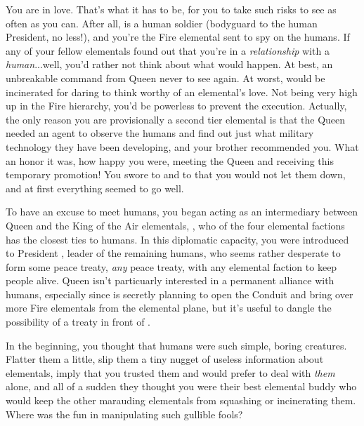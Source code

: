 \documentclass[char]{elementals}
\begin{document}
\name{\cJuliet{}}

You are in love.  That's what it has to be, for you to take such risks to see \cRomeo{\intro} as often as you can.  After all, \cRomeo{\they} is a human soldier (bodyguard to the human President, no less!), and you're the Fire elemental sent to spy on the humans.  If any of your fellow elementals found out that you're in a \emph{relationship} with a \emph{human}...well, you'd rather not think about what would happen.  At best, an unbreakable command from Queen \cQueen{\intro} never to see \cRomeo{} again.  At worst, \cRomeo{\they} would be incinerated for daring to think \cRomeo{\themself} worthy of an elemental's love.  Not being very high up in the Fire hierarchy, you'd be powerless to prevent the execution.  Actually, the only reason you are provisionally a second tier elemental is that the Queen needed an agent to observe the humans and find out just what military technology they have been developing, and your brother \cPyro{\intro} recommended you.  What an honor it was, how happy you were, meeting the Queen and receiving this temporary promotion!  You swore to \cQueen{\them} and to \cPyro{} that you would not let them down, and at first everything seemed to go well.

To have an excuse to meet humans, you began acting as an intermediary between Queen \cQueen{} and the King of the Air elementals, \cKing{\intro}, who of the four elemental factions has the closest ties to humans.  In this diplomatic capacity, you were introduced to President \cLeader{\intro}, leader of the remaining humans, who seems rather desperate to form some peace treaty, \emph{any} peace treaty, with any elemental faction to keep \cLeader{\their} people alive.  Queen \cQueen{} isn't particuarly interested in a permanent alliance with humans, especially since \cQueen{\they} is secretly planning to open the Conduit and bring over more Fire elementals from the elemental plane, but it's useful to dangle the possibility of a treaty in front of \cLeader{\them}.  

In the beginning, you thought that humans were such simple, boring creatures.  Flatter them a little, slip them a tiny nugget of useless information about elementals, imply that you trusted them and would prefer to deal with \emph{them} alone, and all of a sudden they thought you were their best elemental buddy who would keep the other marauding elementals from squashing or incinerating them.  Where was the fun in manipulating such gullible fools?
\end{document}
